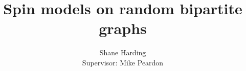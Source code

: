 \documentclass[pdf]{beamer}
\title{Spin models on random bipartite graphs}
\author{Shane Harding \\ Supervisor: Mike Peardon}
\begin{document}
\begin{frame}
\titlepage
\end{frame}

\begin{frame}

\end{frame}


\begin{frame}

\end{frame}
\end{document}
